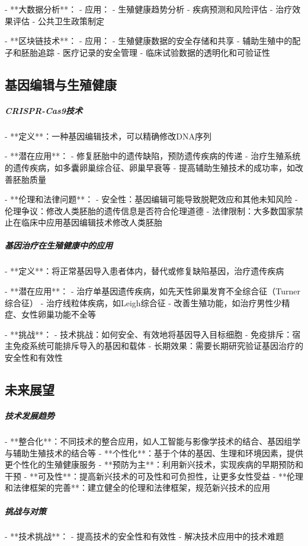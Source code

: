 \begin{enumerate}
- **大数据分析**：
  - 应用：
    - 生殖健康趋势分析
    - 疾病预测和风险评估
    - 治疗效果评估
    - 公共卫生政策制定

- **区块链技术**：
  - 应用：
    - 生殖健康数据的安全存储和共享
    - 辅助生殖中的配子和胚胎追踪
    - 医疗记录的安全管理
    - 临床试验数据的透明化和可验证性

\subsection{基因编辑与生殖健康}

\subparagraph{CRISPR-Cas9技术}

- **定义**：一种基因编辑技术，可以精确修改DNA序列

- **潜在应用**：
  - 修复胚胎中的遗传缺陷，预防遗传疾病的传递
  - 治疗生殖系统的遗传疾病，如多囊卵巢综合征、卵巢早衰等
  - 提高辅助生殖技术的成功率，如改善胚胎质量

- **伦理和法律问题**：
  - 安全性：基因编辑可能导致脱靶效应和其他未知风险
  - 伦理争议：修改人类胚胎的遗传信息是否符合伦理道德
  - 法律限制：大多数国家禁止在临床中应用基因编辑技术修改人类胚胎

\subparagraph{基因治疗在生殖健康中的应用}

- **定义**：将正常基因导入患者体内，替代或修复缺陷基因，治疗遗传疾病

- **潜在应用**：
  - 治疗单基因遗传疾病，如先天性卵巢发育不全综合征（Turner综合征）
  - 治疗线粒体疾病，如Leigh综合征
  - 改善生殖功能，如治疗男性少精症、女性卵巢功能不全等

- **挑战**：
  - 技术挑战：如何安全、有效地将基因导入目标细胞
  - 免疫排斥：宿主免疫系统可能排斥导入的基因和载体
  - 长期效果：需要长期研究验证基因治疗的安全性和有效性

\subsection{未来展望}

\subparagraph{技术发展趋势}

- **整合化**：不同技术的整合应用，如人工智能与影像学技术的结合、基因组学与辅助生殖技术的结合等
- **个性化**：基于个体的基因、生理和环境因素，提供更个性化的生殖健康服务
- **预防为主**：利用新兴技术，实现疾病的早期预防和干预
- **可及性**：提高新兴技术的可及性和可负担性，让更多女性受益
- **伦理和法律框架的完善**：建立健全的伦理和法律框架，规范新兴技术的应用

\subparagraph{挑战与对策}

- **技术挑战**：
  - 提高技术的安全性和有效性
  - 解决技术应用中的技术难题


\end{enumerate}
